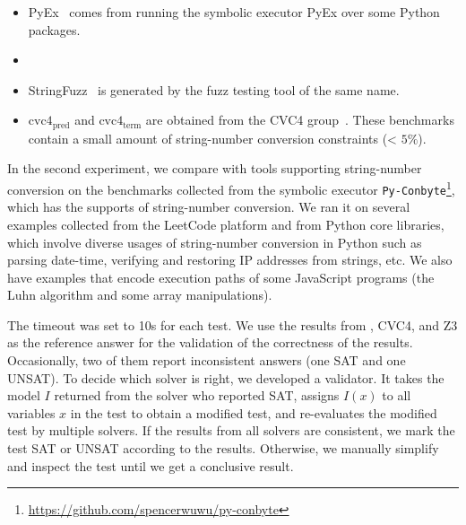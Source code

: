 \begin{itemize}
	\item PyEx~\cite{pyex} comes from running the symbolic executor PyEx over some Python packages.
	
	\smallskip
	
	
	
	


	\item {}
	
		\smallskip

	\item StringFuzz~\cite{blotsky2018stringfuzz}  is generated by the fuzz testing tool of the same name.
	
		\smallskip

	\item $\text{cvc4}_{\text{pred}}$ and $\text{cvc4}_{\text{term}}$ are obtained from the CVC4 group~\cite{termEQ}. These benchmarks contain a small amount of string-number conversion constraints (< $5\%$).
\end{itemize}

In the second experiment, we compare with tools supporting string-number conversion on the benchmarks collected from the symbolic executor \texttt{Py-Conbyte}\footnote{\url{https://github.com/spencerwuwu/py-conbyte}}, which has the supports of string-number conversion. We ran it on several examples collected from the LeetCode platform and from Python core libraries, which involve diverse usages of string-number conversion in Python such as parsing date-time, verifying and restoring IP addresses from strings, etc. We also have examples that encode execution paths of some JavaScript programs (the Luhn algorithm and some array manipulations).

	 The timeout was set to 10s for each test.
We use the results from {\tool}, CVC4, and Z3 as the reference answer for the validation of the correctness of the results. Occasionally, two of them report inconsistent  answers (one SAT and one UNSAT). To decide which solver is right, we developed a validator. It takes the model $I$ returned from the solver who reported SAT, assigns $I(x)$ to all variables $x$ in the test to obtain a modified test, and re-evaluates the modified test by multiple solvers. If the results from all solvers are consistent, we mark the test SAT or UNSAT according to the results. Otherwise, we manually simplify and inspect the test until we get a conclusive result. 

